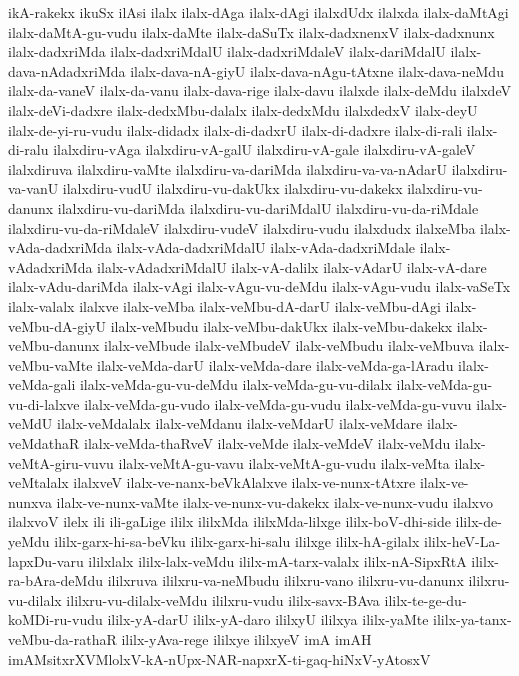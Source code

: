 {ikA-rakekx
ikuSx
ilAsi
ilalx
ilalx-dAga
ilalx-dAgi
ilalxdUdx
ilalxda
ilalx-daMtAgi
ilalx-daMtA-gu-vudu
ilalx-daMte
ilalx-daSuTx
ilalx-dadxnenxV
ilalx-dadxnunx
ilalx-dadxriMda
ilalx-dadxriMdalU
ilalx-dadxriMdaleV
ilalx-dariMdalU
ilalx-dava-nAdadxriMda
ilalx-dava-nA-giyU
ilalx-dava-nAgu-tAtxne
ilalx-dava-neMdu
ilalx-da-vaneV
ilalx-da-vanu
ilalx-dava-rige
ilalx-davu
ilalxde
ilalx-deMdu
ilalxdeV
ilalx-deVi-dadxre
ilalx-dedxMbu-dalalx
ilalx-dedxMdu
ilalxdedxV
ilalx-deyU
ilalx-de-yi-ru-vudu
ilalx-didadx
ilalx-di-dadxrU
ilalx-di-dadxre
ilalx-di-rali
ilalx-di-ralu
ilalxdiru-vAga
ilalxdiru-vA-galU
ilalxdiru-vA-gale
ilalxdiru-vA-galeV
ilalxdiruva
ilalxdiru-vaMte
ilalxdiru-va-dariMda
ilalxdiru-va-va-nAdarU
ilalxdiru-va-vanU
ilalxdiru-vudU
ilalxdiru-vu-dakUkx
ilalxdiru-vu-dakekx
ilalxdiru-vu-danunx
ilalxdiru-vu-dariMda
ilalxdiru-vu-dariMdalU
ilalxdiru-vu-da-riMdale
ilalxdiru-vu-da-riMdaleV
ilalxdiru-vudeV
ilalxdiru-vudu
ilalxdudx
ilalxeMba
ilalx-vAda-dadxriMda
ilalx-vAda-dadxriMdalU
ilalx-vAda-dadxriMdale
ilalx-vAdadxriMda
ilalx-vAdadxriMdalU
ilalx-vA-dalilx
ilalx-vAdarU
ilalx-vA-dare
ilalx-vAdu-dariMda
ilalx-vAgi
ilalx-vAgu-vu-deMdu
ilalx-vAgu-vudu
ilalx-vaSeTx
ilalx-valalx
ilalxve
ilalx-veMba
ilalx-veMbu-dA-darU
ilalx-veMbu-dAgi
ilalx-veMbu-dA-giyU
ilalx-veMbudu
ilalx-veMbu-dakUkx
ilalx-veMbu-dakekx
ilalx-veMbu-danunx
ilalx-veMbude
ilalx-veMbudeV
ilalx-veMbudu
ilalx-veMbuva
ilalx-veMbu-vaMte
ilalx-veMda-darU
ilalx-veMda-dare
ilalx-veMda-ga-lAradu
ilalx-veMda-gali
ilalx-veMda-gu-vu-deMdu
ilalx-veMda-gu-vu-dilalx
ilalx-veMda-gu-vu-di-lalxve
ilalx-veMda-gu-vudo
ilalx-veMda-gu-vudu
ilalx-veMda-gu-vuvu
ilalx-veMdU
ilalx-veMdalalx
ilalx-veMdanu
ilalx-veMdarU
ilalx-veMdare
ilalx-veMdathaR
ilalx-veMda-thaRveV
ilalx-veMde
ilalx-veMdeV
ilalx-veMdu
ilalx-veMtA-giru-vuvu
ilalx-veMtA-gu-vavu
ilalx-veMtA-gu-vudu
ilalx-veMta
ilalx-veMtalalx
ilalxveV
ilalx-ve-nanx-beVkAlalxve
ilalx-ve-nunx-tAtxre
ilalx-ve-nunxva
ilalx-ve-nunx-vaMte
ilalx-ve-nunx-vu-dakekx
ilalx-ve-nunx-vudu
ilalxvo
ilalxvoV
ilelx
ili
ili-gaLige
ililx
ililxMda
ililxMda-lilxge
ililx-boV-dhi-side
ililx-de-yeMdu
ililx-garx-hi-sa-beVku
ililx-garx-hi-salu
ililxge
ililx-hA-gilalx
ililx-heV-La-lapxDu-varu
ililxlalx
ililx-lalx-veMdu
ililx-mA-tarx-valalx
ililx-nA-SipxRtA
ililx-ra-bAra-deMdu
ililxruva
ililxru-va-neMbudu
ililxru-vano
ililxru-vu-danunx
ililxru-vu-dilalx
ililxru-vu-dilalx-veMdu
ililxru-vudu
ililx-savx-BAva
ililx-te-ge-du-koMDi-ru-vudu
ililx-yA-darU
ililx-yA-daro
ililxyU
ililxya
ililx-yaMte
ililx-ya-tanx-veMbu-da-rathaR
ililx-yAva-rege
ililxye
ililxyeV
imA
imAH
imAMsitxrXVMlolxV-kA-nUpx-NAR-napxrX-ti-gaq-hiNxV-yAtosxV
}
